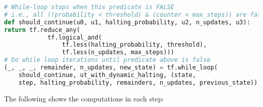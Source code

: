 \begin{lstlisting}[language=Python, caption=UT with dynamic halting.]
# While-loop stops when this predicate is FALSE
# i.e., all ((probability < threshold) & (counter < max_steps)) are false
def should_continue(u0, u1, halting_probability, u2, n_updates, u3):
return tf.reduce_any(
            tf.logical_and(
                tf.less(halting_probability, threshold),
                tf.less(n_updates, max_steps)))
# Do while loop iterations until predicate above is false
(_, _, _, remainder, n_updates, new_state) = tf.while_loop(
    should_continue, ut_with_dynamic_halting, (state, 
    step, halting_probability, remainders, n_updates, previous_state))
\end{lstlisting}







The following shows the computations in each step:


